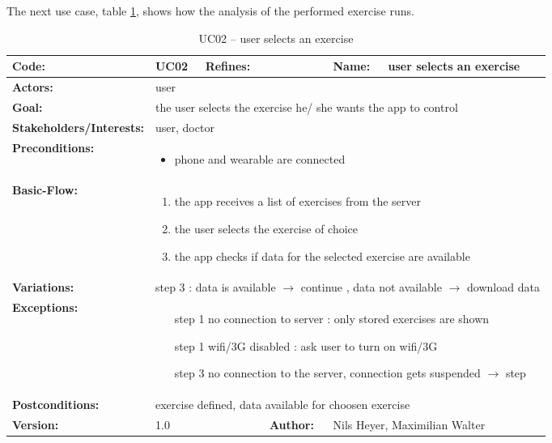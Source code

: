 The next use case, table \ref{tab:1}, shows how the analysis of the performed exercise runs.
\begin{table}[H]
	\begin{tabular}{|l|l|l|l|l|l|} \hline
		\textbf{Code:} & UC02 & \textbf{Refines:} &  & \textbf{Name:} & user selects an exercise \\ \hline
		\textbf{Actors:} & \multicolumn{5}{l|}{user} \\ \hline
		\textbf{Goal:} & \multicolumn{5}{l|}{the user selects the exercise he/ she wants the app to control} \\ \hline
		\textbf{Stakeholders/Interests:} & \multicolumn{5}{l|}{user, doctor} \\ \hline
		\textbf{Preconditions:} & \multicolumn{5}{l|}{\parbox{0.75\textwidth}{
			\begin{itemize}
				\item phone and wearable are connected
			\end{itemize}
		}} \\ \hline
		\textbf{Basic-Flow:} & \multicolumn{5}{l|}{\parbox{0.75\textwidth}{
			\begin{enumerate}
				\item the app receives a list of exercises from the server
				\item the user selects the exercise of choice
				\item the app checks if data for the selected exercise are available
			\end{enumerate}
		}} \\ \hline
		\textbf{Variations:} & \multicolumn{5}{l|}{
			step 3 : data is available $\rightarrow$ continue , data not available  $\rightarrow$ download data
		} \\ \hline
		\textbf{Exceptions:} & \multicolumn{5}{l|}{\parbox{0.75\textwidth}{
			\begin{itemize}[leftmargin=1.55cm]
				\item[step 1] no connection to server :  only stored exercises are shown
				\item[step 1] wifi/3G disabled  : ask user to turn on wifi/3G
				\item[step 3] no connection to the server, connection gets suspended $\rightarrow$ step
			\end{itemize}
		}} \\ \hline
		\textbf{Postconditions:} & \multicolumn{5}{l|}{exercise defined, data available for choosen exercise} \\ \hline
		\textbf{Version:} & \multicolumn{2}{l|}{1.0} & \textbf{Author:} & \multicolumn{2}{l|}{Nils Heyer, Maximilian Walter} \\ \hline
	\end{tabular}
	\caption{UC02 -- user selects an exercise}
	\label{tab:1}
\end{table}

